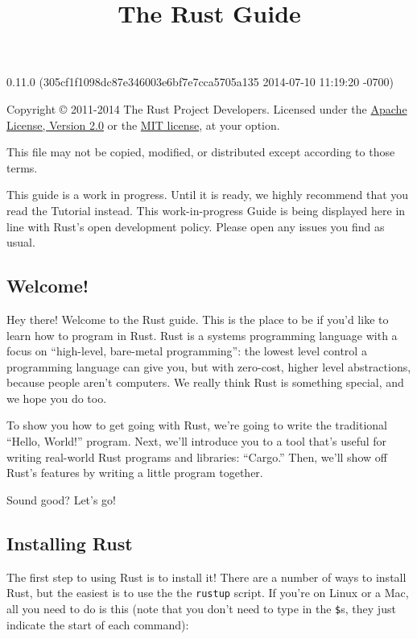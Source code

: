 \documentclass[]{article}
\title{The Rust Guide}
\begin{document}
\maketitle

0.11.0 (305cf1f1098dc87e346003e6bf7e7cca5705a135 2014-07-10 11:19:20 -0700)

Copyright © 2011-2014 The Rust Project Developers. Licensed under the
\href{http://www.apache.org/licenses/LICENSE-2.0}{Apache License,
Version 2.0} or the \href{http://opensource.org/licenses/MIT}{MIT
license}, at your option.

This file may not be copied, modified, or distributed except according
to those terms.

{
\hypersetup{linkcolor=black}
\setcounter{tocdepth}{3}
\tableofcontents
}
This guide is a work in progress. Until it is ready, we highly recommend
that you read the Tutorial instead. This work-in-progress Guide is being
displayed here in line with Rust's open development policy. Please open
any issues you find as usual.

\subsection{Welcome!}\label{welcome}

Hey there! Welcome to the Rust guide. This is the place to be if you'd
like to learn how to program in Rust. Rust is a systems programming
language with a focus on ``high-level, bare-metal programming'': the
lowest level control a programming language can give you, but with
zero-cost, higher level abstractions, because people aren't computers.
We really think Rust is something special, and we hope you do too.

To show you how to get going with Rust, we're going to write the
traditional ``Hello, World!'' program. Next, we'll introduce you to a
tool that's useful for writing real-world Rust programs and libraries:
``Cargo.'' Then, we'll show off Rust's features by writing a little
program together.

Sound good? Let's go!

\subsection{Installing Rust}\label{installing-rust}

The first step to using Rust is to install it! There are a number of
ways to install Rust, but the easiest is to use the the \texttt{rustup}
script. If you're on Linux or a Mac, all you need to do is this (note
that you don't need to type in the \texttt{\$}s, they just indicate the
start of each command):
\end{document}
